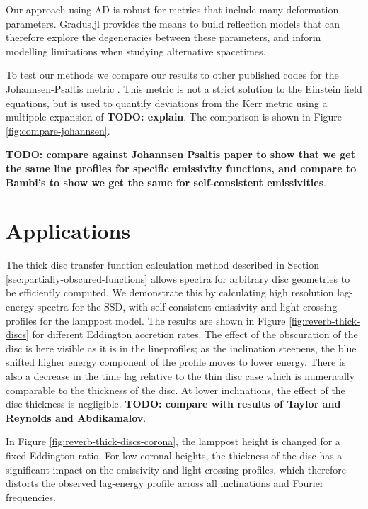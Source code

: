\documentclass[fleqn,usenatbib]{mnras}
\newcommand{\todo}[1]{{\noindent \bf \color{red} TODO: #1}}
\newcommand{\Gradus}{Gradus.jl\xspace}
\begin{document}
Our approach using AD is robust for metrics that include many deformation
parameters. \Gradus provides the means to build reflection models that can
therefore explore the degeneracies between these parameters, and inform
modelling limitations when studying alternative spacetimes.

To test our methods we compare our results to other published codes for the
Johannsen-Psaltis metric \cite{johannsen_regular_2013}. This metric is not a
strict solution to the Einstein field equations, but is used to quantify
deviations from the Kerr metric using a multipole expansion of \todo{explain}.
The comparison is shown in Figure \ref{fig:compare-johannsen}.

\todo{compare against Johannsen Psaltis paper to show that we get the same line profiles for specific emissivity functions, and compare to Bambi's to show we get the same for self-consistent emissivities}.

\section{Applications}
\label{sec:applications}

The thick disc transfer function calculation method described in Section
\ref{sec:partially-obscured-functions} allows spectra for arbitrary disc
geometries to be efficiently computed. We demonstrate this by calculating high
resolution lag-energy spectra for the SSD, with self consistent emissivity and
light-crossing profiles for the lamppost model. The results are shown in Figure
\ref{fig:reverb-thick-discs} for different Eddington accretion rates. The effect
of the obscuration of the disc is here visible as it is in the lineprofiles; as
the inclination steepens, the blue shifted higher energy component of the
profile moves to lower energy. There is also a decrease in the time lag relative
to the thin disc case which is numerically comparable to the thickness of the
disc. At lower inclinations, the effect of the disc thickness is negligible.
\todo{compare with results of Taylor and Reynolds and Abdikamalov}.

In Figure \ref{fig:reverb-thick-discs-corona}, the lamppost height is changed
for a fixed Eddington ratio. For low coronal heights, the thickness of the disc
has a significant impact on the emissivity and light-crossing profiles, which
therefore distorts the observed lag-energy profile across all inclinations and
Fourier frequencies.
\end{document}
